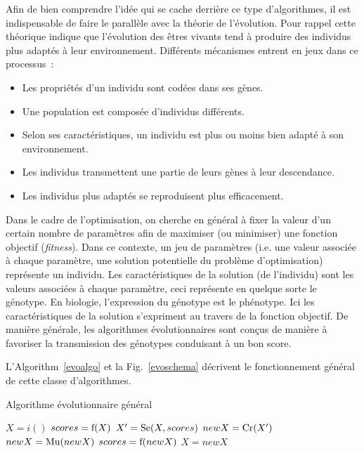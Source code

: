 \documentclass[a4paper, 11pt]{report}
\begin{document}
Afin de bien comprendre l'idée qui se cache derrière ce type d'algorithmes, il est indispensable de faire le parallèle avec la théorie de l'évolution. Pour rappel cette théorique indique que l'évolution des êtres vivants tend à produire des individus plus adaptés à leur environnement. Différents mécanismes entrent en jeux dans ce processus~\cite{WIKI_EVO}:
\begin{itemize}
\item Les propriétés d'un individu sont codées dans ses gènes.
\item Une population est composée d'individus différents.
\item Selon ses caractéristiques, un individu est plus ou moins bien adapté à son environnement.
\item Les individus transmettent une partie de leurs gènes à leur descendance.
\item Les individus plus adaptés se reproduisent plus efficacement.
\end{itemize}

Dans le cadre de l'optimisation, on cherche en général à fixer la valeur d'un certain nombre de paramètres afin de maximiser (ou minimiser) une fonction objectif (\textit{fitness}). Dans ce contexte, un jeu de paramètres (i.e. une valeur associée à chaque paramètre, une solution potentielle du problème d'optimisation) représente un individu. Les caractéristiques de la solution (de l'individu) sont les valeurs associées à chaque paramètre, ceci représente en quelque sorte le génotype. En biologie, l'expression du génotype est le phénotype. Ici les caractéristiques de la solution s'expriment au travers de la fonction objectif. De manière générale, les algorithmes évolutionnaires sont conçus de manière à favoriser la transmission des génotypes conduisant à un bon score.  

L'Algorithm~\ref{evoalgo} et la Fig.~\ref{evoschema} décrivent le fonctionnement général de cette classe d'algorithmes.

\begin{algorithm}                      
\caption{Algorithme évolutionnaire général~\cite{WIKI_EVO}}          
\label{evoalgo}                           
\begin{algorithmic}                    
\STATE $X = i()$ 
\STATE $scores = \textnormal{f}(X)$ 
\STATE $X' = \textnormal{Se}(X, scores)$ 
\STATE $newX = \textnormal{Cr}(X')$  
\STATE $newX = \textnormal{Mu}(newX)$ 
\STATE $scores = \textnormal{f}(newX)$ 
\STATE $X = newX$ 
\ENDWHILE
\end{algorithmic}
\end{algorithm}
\end{document}
